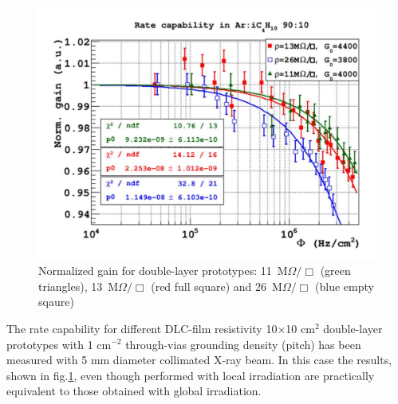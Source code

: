 \begin{figure}[h]
	\begin{center}
		\includegraphics[scale=0.35]{Figures/Muon/microrwell-ariso-ratecapa-double-layer.pdf}	
        \caption{Normalized gain for double-layer prototypes: 11~M$\Omega/\Box$ (green triangles), 13~M$\Omega/\Box$ (red full square) and 26~M$\Omega/\Box$ (blue empty sqaure)}
    	\label{ratecapa-double}
	\end{center}
\end{figure}
%
The rate capability for different DLC-film resistivity 10$\times$10 cm$^2$ double-layer prototypes with 1 cm$^{-2}$ through-vias grounding density (pitch) has been measured with 5 mm diameter collimated X-ray beam. In this case the results, shown in fig.\ref{ratecapa-double}, even though performed with local irradiation are  practically equivalent to those obtained with global irradiation.
%

